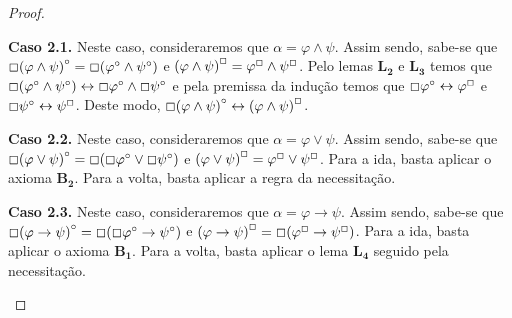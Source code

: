 \begin{theorem}
\begin{proof}
                \begin{casee}
                    \textbf{Caso 2.1.}
                    Neste caso, consideraremos que $\alpha = \varphi\wedge\psi$.
                    Assim sendo, sabe-se que $\Box{(\varphi\wedge\psi)}^\circ=\Box(\varphi^\circ\wedge\psi^\circ)$ e ${(\varphi\wedge\psi)}^\Box=\varphi^\Box\wedge\psi^\Box$.
                    Pelo lemas $\mathbf{L_2}$ e $\mathbf{L_3}$ temos que $\Box(\varphi^\circ\wedge\psi^\circ)\leftrightarrow\Box\varphi^\circ\wedge\Box\psi^\circ$ e pela premissa da indução temos que $\Box\varphi^\circ\leftrightarrow\varphi^\Box$ e $\Box\psi^\circ\leftrightarrow\psi^\Box$.
                    Deste modo, $\Box{(\varphi\wedge\psi)}^\circ\leftrightarrow{(\varphi\wedge\psi)}^\Box$.
                \end{casee}
    
                \begin{casee}
                    \textbf{Caso 2.2.}
                    Neste caso, consideraremos que $\alpha = \varphi\vee\psi$.
                    Assim sendo, sabe-se que $\Box{(\varphi\vee\psi)}^\circ=\Box(\Box\varphi^\circ\vee\Box\psi^\circ)$ e ${(\varphi\vee\psi)}^\Box=\varphi^\Box\vee\psi^\Box$.
                    Para a ida, basta aplicar o axioma $\mathbf{B_2}$.
                    Para a volta, basta aplicar a regra da necessitação.
                \end{casee}
    
                \begin{casee}
                    \textbf{Caso 2.3.}
                    Neste caso, consideraremos que $\alpha=\varphi\to\psi$.
                    Assim sendo, sabe-se que $\Box{(\varphi\to\psi)}^\circ=\Box(\Box\varphi^\circ\to\psi^\circ)$ e ${(\varphi\to\psi)}^\Box=\Box(\varphi^\Box\to\psi^\Box)$.
                    Para a ida, basta aplicar o axioma $\mathbf{B_1}$.
                    Para a volta, basta aplicar o lema $\mathbf{L_4}$ seguido pela necessitação.
                    \qedhere
                \end{casee}
        \end{proof}
    \end{theorem}

